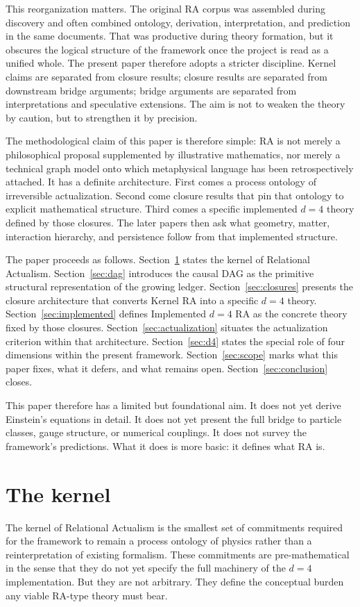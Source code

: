 \documentclass[11pt]{article}
\begin{document}
This reorganization matters. The original RA corpus was assembled during discovery and often combined ontology, derivation, interpretation, and prediction in the same documents. That was productive during theory formation, but it obscures the logical structure of the framework once the project is read as a unified whole. The present paper therefore adopts a stricter discipline. Kernel claims are separated from closure results; closure results are separated from downstream bridge arguments; bridge arguments are separated from interpretations and speculative extensions. The aim is not to weaken the theory by caution, but to strengthen it by precision.

The methodological claim of this paper is therefore simple: RA is not merely a philosophical proposal supplemented by illustrative mathematics, nor merely a technical graph model onto which metaphysical language has been retrospectively attached. It has a definite architecture. First comes a process ontology of irreversible actualization. Second come closure results that pin that ontology to explicit mathematical structure. Third comes a specific implemented $d=4$ theory defined by those closures. The later papers then ask what geometry, matter, interaction hierarchy, and persistence follow from that implemented structure.

The paper proceeds as follows. Section~\ref{sec:kernel} states the kernel of Relational Actualism. Section~\ref{sec:dag} introduces the causal DAG as the primitive structural representation of the growing ledger. Section~\ref{sec:closures} presents the closure architecture that converts Kernel RA into a specific $d=4$ theory. Section~\ref{sec:implemented} defines Implemented $d=4$ RA as the concrete theory fixed by those closures. Section~\ref{sec:actualization} situates the actualization criterion within that architecture. Section~\ref{sec:d4} states the special role of four dimensions within the present framework. Section~\ref{sec:scope} marks what this paper fixes, what it defers, and what remains open. Section~\ref{sec:conclusion} closes.

This paper therefore has a limited but foundational aim. It does not yet derive Einstein's equations in detail. It does not yet present the full bridge to particle classes, gauge structure, or numerical couplings. It does not survey the framework's predictions. What it does is more basic: it defines what RA is.

\section{The kernel}\label{sec:kernel}
The kernel of Relational Actualism is the smallest set of commitments required for the framework to remain a process ontology of physics rather than a reinterpretation of existing formalism. These commitments are pre-mathematical in the sense that they do not yet specify the full machinery of the $d=4$ implementation. But they are not arbitrary. They define the conceptual burden any viable RA-type theory must bear.
\end{document}
